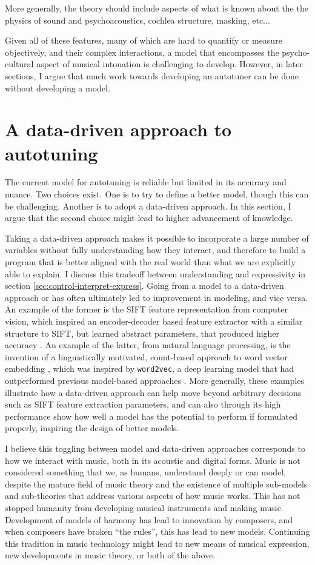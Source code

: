 More generally, the theory should include aspects of what is known about the the physics of sound and psychoacoustics, cochlea structure, masking, etc...

Given all of these features, many of which are hard to quantify or measure objectively, and their complex interactions, a model that encompasses the psycho-cultural aspect of musical intonation is challenging to develop. However, in later sections, I argue that much work towards developing an autotuner can be done without developing a model.

\section{A data-driven approach to autotuning}
\label{sec:pretheory}
The current model for autotuning is reliable but limited in its accuracy and nuance. Two choices exist. One is to try to define a better model, though this can be challenging. Another is to adopt a data-driven approach. In this section, I argue that the second choice might lead to higher advancement of knowledge. 

Taking a data-driven approach makes it possible to incorporate a large number of variables without fully understanding how they interact, and therefore to build a program that is better aligned with the real world than what we are explicitly able to explain. I discuss this tradeoff between understanding and expressivity in section \ref{sec:control-interpret-express}. Going from a model to a data-driven approach or has often ultimately led to improvement in modeling, and vice versa. An example of the former is the SIFT feature representation from computer vision, which inspired an encoder-decoder based feature extractor with a similar structure to SIFT, but learned abstract parameters, that produced higher accuracy \cite{zheng2017sift}. An example of the latter, from natural language processing, is the invention of a linguistically motivated, count-based approach to word vector embedding \cite{pennington2014glove}, which was inspired by \texttt{word2vec}, a deep learning model that had outperformed previous model-based approaches \cite{mikolov2013efficient}. More generally, these examples illustrate how a data-driven approach can help move beyond arbitrary decisions such as SIFT feature extraction parameters, and can also through its high performance show how well a model has the potential to perform if formulated properly, inspiring the design of better models.

I believe this toggling between model and data-driven approaches corresponds to how we interact with music, both in its acoustic and digital forms. Music is not considered something that we, as humans, understand deeply or can model, despite the mature field of music theory and the existence of multiple sub-models and sub-theories that address various aspects of how music works. This has not stopped humanity from developing musical instruments and making music. Development of models of harmony has lead to innovation by composers, and when composers have broken ``the rules'', this has lead to new models. Continuing this tradition in music technology might lead to new means of musical expression, new developments in music theory, or both of the above.

